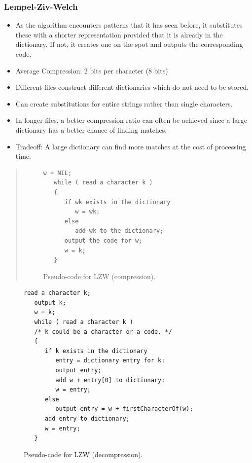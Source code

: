 \documentclass{beamer}
\begin{document}
\begin{frame}
   \frametitle{Lempel-Ziv-Welch}
   \begin{itemize}
   \item{ As the algorithm encounters patterns that it has seen before, it substitutes these with a shorter representation provided that it is already in the dictionary. If not, it creates one on the spot and outputs the corresponding code.}
   \pause
   \item{Average Compression: 2 bits per character (8 bits)}
   \pause
   \item{Different files construct different dictionaries which do not need to be stored.}
   \pause
   \item{Can create substitutions for entire strings rather than single characters.}
   \pause
   \item{In longer files, a better compression ratio can often be achieved since a large dictionary has a better chance of finding matches.}
   \pause
   \item{Tradeoff: A large dictionary can find more matches at the cost of processing time.}
   \end{itemize}
\end{frame}

\begin{frame}[fragile]
\begin{quote}
\begin{figure}[!htbp]
\begin{verbatim}
w = NIL;
   while ( read a character k )
   {
      if wk exists in the dictionary
         w = wk;
      else
         add wk to the dictionary;
      output the code for w;
      w = k;
   }
\end{verbatim}
\caption{Pseudo-code for LZW (compression).}
\end{figure}
\end{quote}
\end{frame}

\begin{frame}[fragile]
\begin{figure}[!htbp]
\begin{verbatim}
read a character k;
   output k;
   w = k;
   while ( read a character k )
   /* k could be a character or a code. */
   {
      if k exists in the dictionary
         entry = dictionary entry for k;
         output entry;
         add w + entry[0] to dictionary;
         w = entry;
      else
         output entry = w + firstCharacterOf(w);
      add entry to dictionary;
      w = entry;
   }
\end{verbatim}
\caption{Pseudo-code for LZW (decompression).}
\end{figure}
\end{frame}
\end{document}
